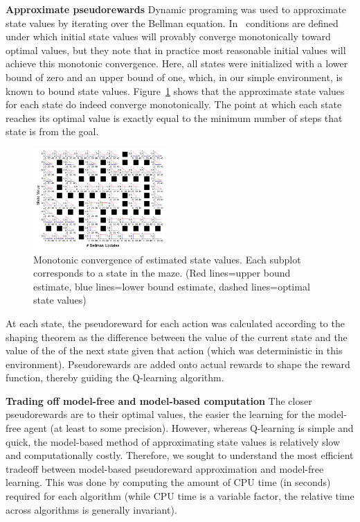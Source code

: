 \documentclass[letterpaper]{article}
\begin{document}
\noindent
\textbf{Approximate pseudorewards} Dynamic programing was used to approximate state values by iterating over the Bellman equation. In~\cite{mcmahan2005bounded} conditions are defined under which initial state values will provably converge monotonically toward optimal values, but they note that in practice most reasonable initial values will achieve this monotonic convergence. Here, all states were initialized with a lower bound of zero and an upper bound of one, which, in our simple environment, is known to bound state values. Figure~\ref{fig:value_bounds} shows that the approximate state values for each state do indeed converge monotonically. The point at which each state reaches its optimal value is exactly equal to the minimum number of steps that state is from the goal.

\begin{figure}[ht]
\centering
\includegraphics[width=0.45\textwidth]{value_bounds_labeled}
\caption{Monotonic convergence of estimated state values. Each subplot corresponds to a state in the maze. (Red lines=upper bound estimate, blue lines=lower bound estimate, dashed lines=optimal state values)}
\label{fig:value_bounds}
\end{figure}

At each state, the pseudoreward for each action was calculated according to the shaping theorem as the difference between the value of the current state and the value of the of the next state given that action (which was deterministic in this environment). Pseudorewards are added onto actual rewards to shape the reward function, thereby guiding the Q-learning algorithm.

\noindent
\textbf{Trading off model-free and model-based computation} The closer pseudorewards are to their optimal values, the easier the learning for the model-free agent (at least to some precision). However, whereas Q-learning is simple and quick, the model-based method of approximating state values is relatively slow and computationally costly. Therefore, we sought to understand the most efficient tradeoff between model-based pseudoreward approximation and model-free learning. This was done by computing the amount of CPU time (in seconds) required for each algorithm (while CPU time is a variable factor, the relative time across algorithms is generally invariant).
\end{document}
